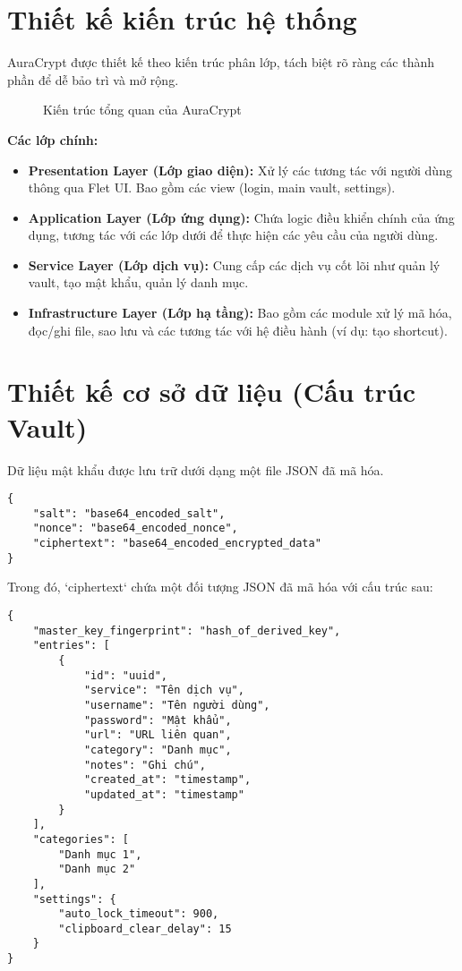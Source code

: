 \section{Thiết kế kiến trúc hệ thống}
AuraCrypt được thiết kế theo kiến trúc phân lớp, tách biệt rõ ràng các thành phần để dễ bảo trì và mở rộng.

\begin{figure}[H]
    \centering
    \caption{Kiến trúc tổng quan của AuraCrypt}
    \label{fig:architecture_diagram}
\end{figure}
\textbf{Các lớp chính:}
\begin{itemize}
    \item \textbf{Presentation Layer (Lớp giao diện):} Xử lý các tương tác với người dùng thông qua Flet UI. Bao gồm các view (login, main vault, settings).
    \item \textbf{Application Layer (Lớp ứng dụng):} Chứa logic điều khiển chính của ứng dụng, tương tác với các lớp dưới để thực hiện các yêu cầu của người dùng.
    \item \textbf{Service Layer (Lớp dịch vụ):} Cung cấp các dịch vụ cốt lõi như quản lý vault, tạo mật khẩu, quản lý danh mục.
    \item \textbf{Infrastructure Layer (Lớp hạ tầng):} Bao gồm các module xử lý mã hóa, đọc/ghi file, sao lưu và các tương tác với hệ điều hành (ví dụ: tạo shortcut).
\end{itemize}

\section{Thiết kế cơ sở dữ liệu (Cấu trúc Vault)}
Dữ liệu mật khẩu được lưu trữ dưới dạng một file JSON đã mã hóa.
\begin{lstlisting}[caption=Cấu trúc dữ liệu vault mã hóa]
{
    "salt": "base64_encoded_salt",
    "nonce": "base64_encoded_nonce",
    "ciphertext": "base64_encoded_encrypted_data"
}
\end{lstlisting}
Trong đó, `ciphertext` chứa một đối tượng JSON đã mã hóa với cấu trúc sau:
\begin{lstlisting}[caption=Cấu trúc dữ liệu nội dung vault (chưa mã hóa)]
{
    "master_key_fingerprint": "hash_of_derived_key",
    "entries": [
        {
            "id": "uuid",
            "service": "Tên dịch vụ",
            "username": "Tên người dùng",
            "password": "Mật khẩu",
            "url": "URL liên quan",
            "category": "Danh mục",
            "notes": "Ghi chú",
            "created_at": "timestamp",
            "updated_at": "timestamp"
        }
    ],
    "categories": [
        "Danh mục 1",
        "Danh mục 2"
    ],
    "settings": {
        "auto_lock_timeout": 900,
        "clipboard_clear_delay": 15
    }
}
\end{lstlisting}
